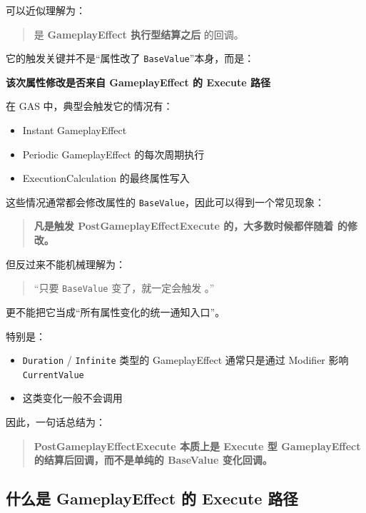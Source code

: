 \documentclass[10pt,CJKmath]{ctexart}
\begin{document}
可以近似理解为：

\begin{quote}
	 是 \textbf{GameplayEffect 执行型结算之后} 的回调。
\end{quote}

它的触发关键并不是“属性改了 \verb|BaseValue|”本身，而是：

\begin{center}
	\textbf{该次属性修改是否来自 GameplayEffect 的 Execute 路径}
\end{center}

在 GAS 中，典型会触发它的情况有：

\begin{itemize}
	\item Instant GameplayEffect
	\item Periodic GameplayEffect 的每次周期执行
	\item ExecutionCalculation 的最终属性写入
\end{itemize}

这些情况通常都会修改属性的 \verb|BaseValue|，因此可以得到一个常见现象：

\begin{quote}
	\textbf{凡是触发 PostGameplayEffectExecute 的，大多数时候都伴随着  的修改。}
\end{quote}

但反过来不能机械理解为：

\begin{quote}
	“只要 \verb|BaseValue| 变了，就一定会触发 。”
\end{quote}

更不能把它当成“所有属性变化的统一通知入口”。

特别是：

\begin{itemize}
	\item \verb|Duration| / \verb|Infinite| 类型的 GameplayEffect 通常只是通过 Modifier 影响 \verb|CurrentValue|
	\item 这类变化一般不会调用 
\end{itemize}

因此，一句话总结为：

\begin{quote}
	\textbf{PostGameplayEffectExecute 本质上是 Execute 型 GameplayEffect 的结算后回调，而不是单纯的 BaseValue 变化回调。}
\end{quote}

\subsection{什么是 GameplayEffect 的 Execute 路径}
\end{document}
